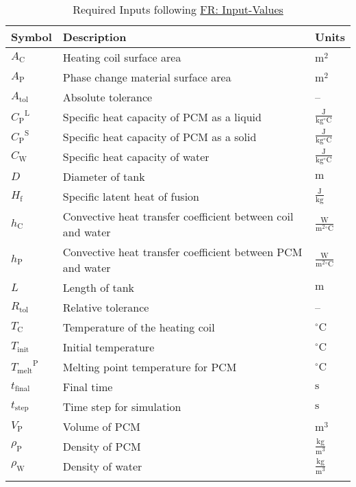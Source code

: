 \documentclass[12pt]{article}
\begin{document}
\begin{longtabu}{l X[l] l}
\toprule
\textbf{Symbol} & \textbf{Description} & \textbf{Units}
\\
\midrule
\endhead
${A_{\text{C}}}$ & Heating coil surface area & ${\text{m}^{2}}$
\\
${A_{\text{P}}}$ & Phase change material surface area & ${\text{m}^{2}}$
\\
${A_{\text{tol}}}$ & Absolute tolerance & --
\\
${{C_{\text{P}}}^{\text{L}}}$ & Specific heat capacity of PCM as a liquid & $\frac{\text{J}}{\text{kg}{}^{\circ}\text{C}}$
\\
${{C_{\text{P}}}^{\text{S}}}$ & Specific heat capacity of PCM as a solid & $\frac{\text{J}}{\text{kg}{}^{\circ}\text{C}}$
\\
${C_{\text{W}}}$ & Specific heat capacity of water & $\frac{\text{J}}{\text{kg}{}^{\circ}\text{C}}$
\\
$D$ & Diameter of tank & ${\text{m}}$
\\
${H_{\text{f}}}$ & Specific latent heat of fusion & $\frac{\text{J}}{\text{kg}}$
\\
${h_{\text{C}}}$ & Convective heat transfer coefficient between coil and water & $\frac{\text{W}}{\text{m}^{2}{}^{\circ}\text{C}}$
\\
${h_{\text{P}}}$ & Convective heat transfer coefficient between PCM and water & $\frac{\text{W}}{\text{m}^{2}{}^{\circ}\text{C}}$
\\
$L$ & Length of tank & ${\text{m}}$
\\
${R_{\text{tol}}}$ & Relative tolerance & --
\\
${T_{\text{C}}}$ & Temperature of the heating coil & ${{}^{\circ}\text{C}}$
\\
${T_{\text{init}}}$ & Initial temperature & ${{}^{\circ}\text{C}}$
\\
${{T_{\text{melt}}}^{\text{P}}}$ & Melting point temperature for PCM & ${{}^{\circ}\text{C}}$
\\
${t_{\text{final}}}$ & Final time & ${\text{s}}$
\\
${t_{\text{step}}}$ & Time step for simulation & ${\text{s}}$
\\
${V_{\text{P}}}$ & Volume of PCM & ${\text{m}^{3}}$
\\
${ρ_{\text{P}}}$ & Density of PCM & $\frac{\text{kg}}{\text{m}^{3}}$
\\
${ρ_{\text{W}}}$ & Density of water & $\frac{\text{kg}}{\text{m}^{3}}$
\\
\bottomrule
\caption{Required Inputs following \hyperref[inputValues]{FR: Input-Values}}
\label{Table:ReqInputs}
\end{longtabu}
\end{document}
